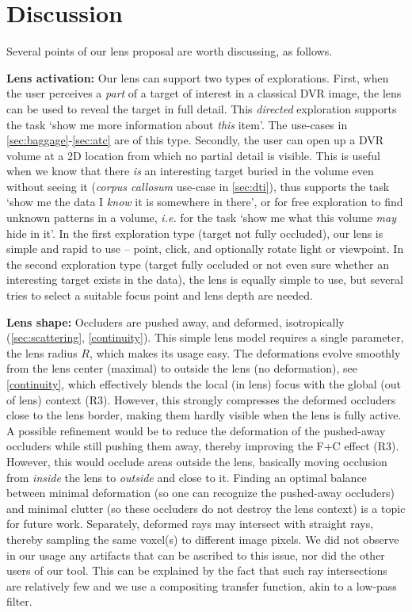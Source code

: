 %
\section{Discussion}
\label{sec:discussion}
%
%
Several points of our lens proposal are worth discussing, as follows.

\vspace{0.15cm}
\noindent\textbf{Lens activation:} Our lens can support two types of explorations. First, when the user perceives a \emph{part} of a target of interest in a classical DVR image, the lens can be used to reveal the target in full detail. This \emph{directed} exploration supports the task `show me more information about \emph{this} item'. The use-cases in \autoref{sec:baggage}-\autoref{sec:atc} are of this type. Secondly, the user can open up a DVR volume at a 2D location from which no partial detail is visible. This is useful when we know that there \emph{is} an interesting target buried in the volume even without seeing it (\emph{corpus callosum} use-case in \autoref{sec:dti}), thus supports the task `show me the data I \emph{know} it is somewhere in there', or for free exploration to find unknown patterns in a volume, \emph{i.e.} for the task `show me what this volume \emph{may} hide in it'. In the first exploration type (target not fully occluded), our lens is simple and rapid to use -- point, click, and optionally rotate light or viewpoint. In the second exploration type (target fully occluded or not even sure whether an interesting target exists in the data), the lens is equally simple to use, but several tries to select a suitable focus point and lens depth are needed.

\vspace{0.15cm}
\noindent\textbf{Lens shape:} Occluders are pushed away, and deformed, isotropically (\autoref{sec:scattering}, \autoref{continuity}). This simple lens model requires a single parameter, the lens radius $R$, which makes its usage easy. The deformations evolve smoothly from the lens center (maximal) to outside the lens (no deformation), see \autoref{continuity}, which effectively blends the local (in lens) focus with the global (out of lens) context (R3). However, this strongly compresses the deformed occluders close to the lens border, making them hardly visible when the lens is fully active. A possible refinement would be to reduce the deformation of the pushed-away occluders while still pushing them away, thereby improving the F+C effect (R3). However, this would occlude areas outside the lens, basically moving occlusion from \emph{inside} the lens to \emph{outside} and close to it. Finding an optimal balance between minimal deformation (so one can recognize the pushed-away occluders) and minimal clutter (so these occluders do not destroy the lens context) is a topic for future work. Separately, deformed rays may intersect with straight rays, thereby sampling the same voxel(s) to different image pixels. We did not observe in our usage any artifacts that can be ascribed to this issue, nor did the other users of our tool. This can be explained by the fact that such ray intersections are relatively few and we use a compositing transfer function, akin to a low-pass filter.

